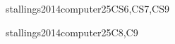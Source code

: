 \begin{syllabus}
\begin{unit}{\IASCryptography}{}{stallings2014computer}{25}{CS6,CS7,CS9}
\begin{topics}%
    \item \IASCryptographyTopicBasic
    \item \IASCryptographyTopicCipher
    \item \IASCryptographyTopicPublic
    \item \IASCryptographyTopicSymmetric
    \item \IASCryptographyTopicPublicKey
    \item \IASCryptographyTopicAuthenticated
    \item \IASCryptographyTopicCryptographic
\end{topics}
\begin{learningoutcomes}
    \item \IASCryptographyLODescribeTheCryptography [\Familiarity]
    \item \IASCryptographyLODefineTheCipher [\Familiarity]
    \item \IASCryptographyLODiscussThePrime [\Familiarity]
    \item \IASCryptographyLOIllustrateHow [\Usage]
    \item \IASCryptographyLOUsePublic [\Usage]
    \item \IASCryptographyLOExplainHowProtocols [\Familiarity]
    \item \IASCryptographyLODiscussCryptographic [\Familiarity]
\end{learningoutcomes}
\end{unit}

\begin{unit}{\IASWebSecurity}{}{stallings2014computer}{25}{C8,C9}
\begin{topics}%
    \item \IASWebSecurityTopicWeb
    \item \IASWebSecurityTopicSession
    \item \IASWebSecurityTopicApplication
    \item \IASWebSecurityTopicClient
    \item \IASWebSecurityTopicServer
\end{topics}
\begin{learningoutcomes}
    \item \IASWebSecurityLODescribeTheModel [\Familiarity]
    \item \IASWebSecurityLODiscussTheWeb [\Familiarity]
    \item \IASWebSecurityLOInvestigate [\Familiarity]
    \item \IASWebSecurityLOUseClient [\Usage]
\end{learningoutcomes}
\end{unit}


\end{syllabus}
